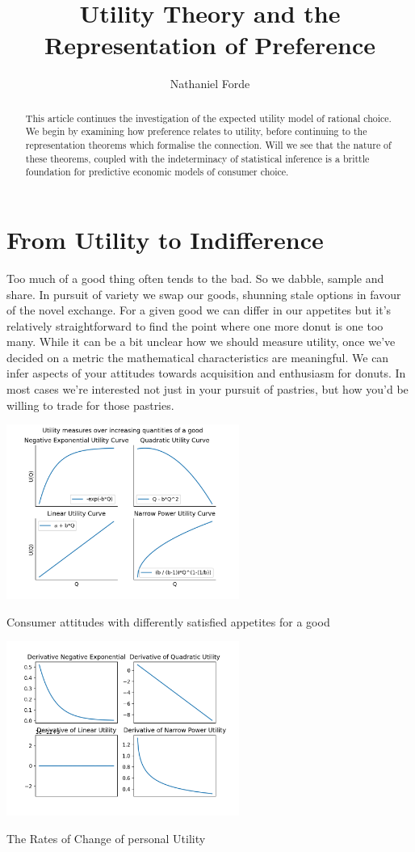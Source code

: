 \documentclass{tufte-handout}
\title{Utility Theory and the Representation of Preference}
\author[Nathaniel Forde]{Nathaniel Forde}
\begin{document}
\maketitle%

\begin{abstract}
\noindent
This article continues the investigation of the expected utility model of rational choice. We begin by examining how preference relates to utility, before continuing to the representation theorems which formalise the connection. Will we see that the nature of these theorems, coupled with the indeterminacy of statistical inference is a brittle foundation for predictive economic models of consumer choice.
\end{abstract}


\section{From Utility to Indifference}
Too much of a good thing often tends to the bad. So we dabble, sample and share. In pursuit of variety we swap our goods, shunning stale options in favour of the novel exchange.  For a given good we can differ in our appetites but it's relatively straightforward to find the point where one more donut is one too many. While it can be a bit unclear how we should measure utility, once we've decided on a metric the mathematical characteristics are meaningful. We can infer aspects of your attitudes towards acquisition and enthusiasm for donuts. In most cases we're interested not just in your pursuit of pastries, but how you'd be willing to trade for those pastries. 

\begin{marginfigure}
\includegraphics[width=3in]{Plots/utility_in_1_dimension.png}
\caption{Consumer attitudes with differently satisfied appetites for a good}
\includegraphics[width=3in]{Plots/derivatives_of_utility.png}
\caption{The Rates of Change of personal Utility}
\end{marginfigure} 
\end{document}
